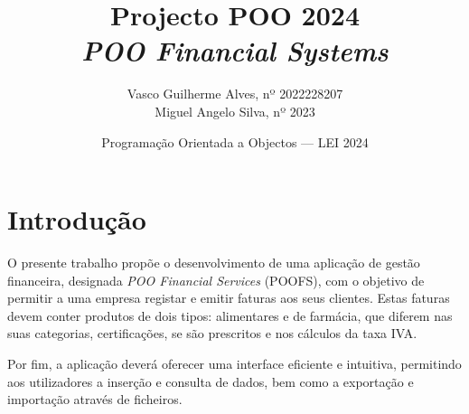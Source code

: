\documentclass[a4paper, 11pt]{article}
\title{\Huge Projecto POO 2024\\
        \it \huge POO Financial Systems
}
\author{Vasco Guilherme Alves, nº 2022228207\\
Miguel Angelo Silva, nº 2023\\
}
\date{Programação Orientada a Objectos --- LEI 2024}
\newcommand\ssection[1]{\section*{\color{MidnightBlue} #1} }
\begin{document}
\maketitle

\ssection{Introdução}

O presente trabalho propõe o desenvolvimento de uma aplicação de gestão financeira, designada \textit{POO Financial Services} (POOFS), com o objetivo de permitir a uma empresa registar e emitir faturas aos seus clientes. Estas faturas devem conter produtos de dois tipos: alimentares e de farmácia, que diferem nas suas categorias, certificações, se são prescritos e nos cálculos da taxa IVA.

Por fim, a aplicação deverá oferecer uma interface eficiente e intuitiva, permitindo aos utilizadores a inserção e consulta de dados, bem como a exportação e importação através de ficheiros.
\end{document}
